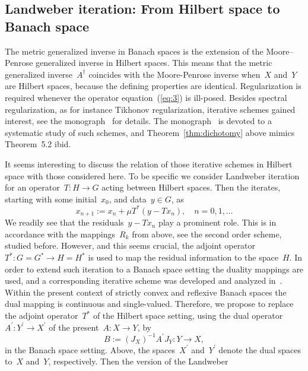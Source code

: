 \documentclass[12pt]{amsart}
\newcommand{\lr}[1]{\left(#1\right)}
\newcommand{\Ad}{A^\dag}
\theoremstyle{remark}
\begin{document}
\subsection{Landweber iteration: From Hilbert space to Banach space}
\label{sec:relat-spectr-regul}

The metric generalized inverse in Banach spaces is the extension of the Moore--Penrose
generalized inverse in Hilbert spaces. This means that the metric generalized inverse~$\Ad$ coincides
with the Moore-Penrose inverse when~$X$ and~$Y$ are Hilbert spaces,
because the defining properties are identical. Regularization is
required whenever the operator equation~(\ref{eq:3}) is
ill-posed. Besides spectral regularization, as for instance Tikhonov
regularization, iterative schemes gained interest, see the
monograph~\cite{MR1408680} for details. The monograph~\cite{MR859375}
is devoted to a systematic study of such
schemes, and Theorem~\ref{thm:dichotomy} above mimics Theorem~5.2 ibid.
\par
It seems interesting to discuss the relation of those iterative
schemes in Hilbert space with those considered here. To be specific we
consider Landweber iteration for an operator~$T\colon H \to G$ acting
between Hilbert spaces. Then the iterates, starting with some
initial~$x_{0}$, and data~$y\in G$, as
\begin{equation}
  \label{eq:landweber}
  x_{n+1} := x_{n} + \mu T^{\ast}\lr{y - T x_{n}},\quad n=0,1,\dots
\end{equation}
We readily see that the residuals~$y - T x_{n}$ play a prominent
role. This is in accordance with the mappings~$R_{k}$ from
above, see the second order scheme, studied before. However, and this seems crucial, the adjoint
operator~$T^{\ast}\colon G =G^{\ast} \to H=H^{\ast}$ is used to
map the residual information to the space~$H$. In order to extend such
iteration to a Banach space setting the duality mappings are used, and
a corresponding iterative scheme was developed and analyzed
in~\cite[Chapt.~6]{MR2963507}.
Within the present context of strictly convex and reflexive
  Banach spaces the dual mapping is continuous and single-valued. Therefore, we propose to replace the adjoint operator~$T^{\ast}$ of
  the Hilbert space setting, using the dual 
  operator~$A^{\prime}\colon Y^{\prime} \to X^{\prime}$ of the
  present~$A \colon X \to Y$, by
\begin{equation}
  \label{eq:9}
  B:= \lr{J_{X}}^{-1} A^{\prime} J_{Y}\colon Y \to X,
\end{equation}
in the Banach space setting. Above, the spaces~$X^\prime$ and~$Y^\prime$ denote the dual spaces to~$X$ and~$Y$, respectively. Then the version of the Landweber
\end{document}
